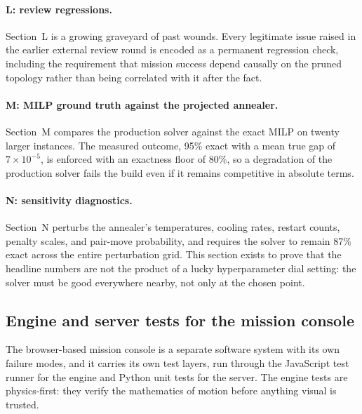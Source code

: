 \paragraph{L: review regressions.}
Section~L is a growing graveyard of past wounds. Every legitimate issue
raised in the earlier external review round is encoded as a permanent
regression check, including the requirement that mission success depend
causally on the pruned topology rather than being correlated with it after
the fact.

\paragraph{M: MILP ground truth against the projected annealer.}
Section~M compares the production solver against the exact MILP on twenty
larger instances. The measured outcome, 95\% exact with a mean true gap of
$7\times10^{-5}$, is enforced with an exactness floor of 80\%, so a
degradation of the production solver fails the build even if it remains
competitive in absolute terms.

\paragraph{N: sensitivity diagnostics.}
Section~N perturbs the annealer's temperatures, cooling rates, restart
counts, penalty scales, and pair-move probability, and requires the solver
to remain 87\% exact across the entire perturbation grid. This section
exists to prove that the headline numbers are not the product of a lucky
hyperparameter dial setting: the solver must be good everywhere nearby, not
only at the chosen point.

\subsection{Engine and server tests for the mission console}

The browser-based mission console is a separate software system with its
own failure modes, and it carries its own test layers, run through the
JavaScript test runner for the engine and Python unit tests for the
server. The engine tests are physics-first: they verify the mathematics of
motion before anything visual is trusted.

